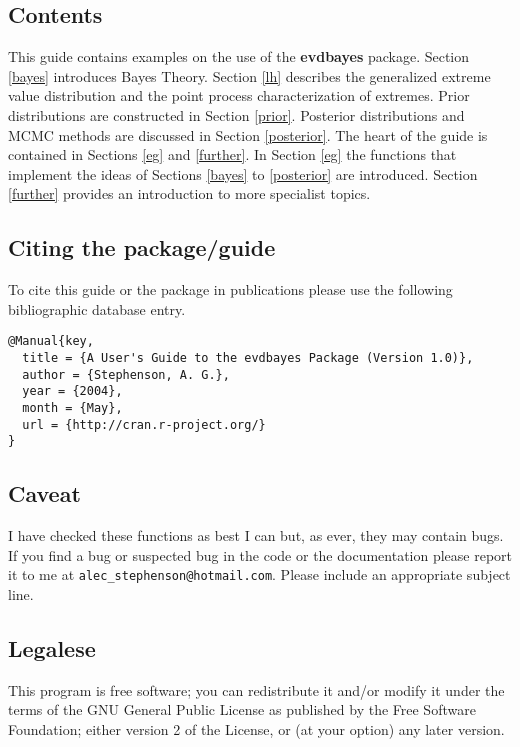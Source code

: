 \documentclass[11pt,a4paper]{article}
\begin{document}
\subsection{Contents}

This guide contains examples on the use of the \textbf{evdbayes} package.
Section \ref{bayes} introduces Bayes Theory.
Section \ref{lh} describes the generalized extreme value distribution and the point process characterization of extremes.
Prior distributions are constructed in Section \ref{prior}. 
Posterior distributions and MCMC methods are discussed in Section \ref{posterior}.
The heart of the guide is contained in Sections \ref{eg} and \ref{further}.
In Section \ref{eg} the functions that implement the ideas of Sections \ref{bayes} to \ref{posterior} are introduced.
Section \ref{further} provides an introduction to more specialist topics.

\subsection{Citing the package/guide}

To cite this guide or the package in publications please use the following bibliographic database entry. 
\begin{verbatim}
@Manual{key,
  title = {A User's Guide to the evdbayes Package (Version 1.0)},
  author = {Stephenson, A. G.},
  year = {2004},
  month = {May},
  url = {http://cran.r-project.org/}
}
\end{verbatim}

\subsection{Caveat}

I have checked these functions as best I can but, as ever, they may
contain bugs. 
If you find a bug or suspected bug in the code or the documentation
please report it to me at \verb+alec_stephenson@hotmail.com+.  
Please include an appropriate subject line.

\subsection{Legalese}

This program is free software; you can redistribute it and/or
modify it under the terms of the GNU General Public License
as published by the Free Software Foundation; either version 2
of the License, or (at your option) any later version.
\end{document}
